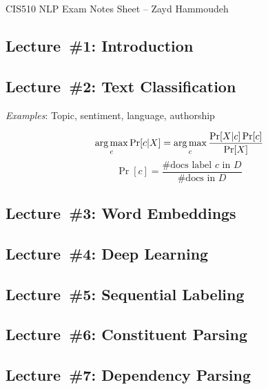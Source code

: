\documentclass[9pt]{extarticle}
\begin{document}
\begin{center}
CIS510 NLP Exam Notes Sheet -- Zayd Hammoudeh
\end{center}
\begin{multicols}{3}
  \subsection*{Lecture~\#1: Introduction}
  \subsection*{Lecture~\#2: Text Classification}
  \textit{Examples}: Topic, sentiment, language, authorship

  \begin{equation*}\label{eq:L02:NaiveBayes}
    \operatorname*{arg\,max}_c \Pr\lbrack c \vert X\rbrack = \operatorname*{arg\,max}_{c} \frac{\Pr[X \vert c] \Pr[c]}{\Pr[X]}
  \end{equation*}
  \begin{equation*}\label{eq:L02:Bernoulli}
    \Pr[c] = \frac{\text{\#docs label } c \text{ in } D}{\text{\#docs in } D}
  \end{equation*}
  \subsection*{Lecture~\#3: Word Embeddings}
  \subsection*{Lecture~\#4: Deep Learning}
  \subsection*{Lecture~\#5: Sequential Labeling}
  \subsection*{Lecture~\#6: Constituent Parsing}
  \subsection*{Lecture~\#7: Dependency Parsing}

\end{multicols}
\end{document}
